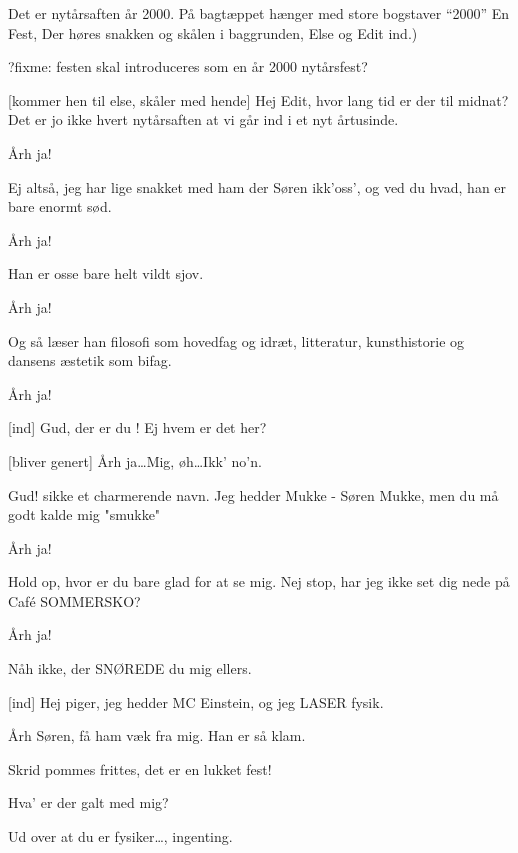 \documentclass[danish]{article}
\begin{document}
\begin{sketch}
\scene
Det er nytårsaften år 2000. På bagtæppet hænger med store bogstaver
``2000''
En Fest, Der høres snakken og skålen i baggrunden, Else og Edit ind.)

?fixme: festen skal introduceres som en år 2000 nytårsfest?

[kommer hen til else, skåler med hende] Hej Edit, hvor lang
tid er der til midnat? Det er jo ikke hvert nytårsaften at vi går ind
i et nyt årtusinde.

 Årh ja!

 Ej altså, jeg har lige snakket med ham der Søren ikk'oss', og ved du
hvad, han er bare enormt sød.

 Årh ja!

 Han er osse bare helt vildt sjov.

 Årh ja!

 Og så læser han filosofi som hovedfag og idræt,
litteratur, kunsthistorie og dansens æstetik som bifag.

 Årh ja! 

[ind] Gud, der er du ! Ej hvem er det her? 

[bliver genert] Årh ja\ldots Mig, øh\ldots Ikk' no'n.

 Gud! sikke et charmerende navn. Jeg hedder Mukke - Søren Mukke, men du 
må godt kalde mig "smukke" 



 Årh ja!

 Hold op, hvor er du bare glad for at se mig. 
Nej stop, har jeg ikke set dig nede på Caf\'e SOMMERSKO?

 Årh ja!

 Nåh ikke, der SNØREDE du mig ellers. 

[ind] Hej piger, jeg hedder MC Einstein, og jeg LASER fysik.

 Årh Søren, få ham væk fra mig. Han er så klam.

 Skrid pommes frittes, det er en lukket fest!

 Hva' er der galt med mig?

 Ud over at du er fysiker\ldots, ingenting.


\end{sketch}
\end{document}

